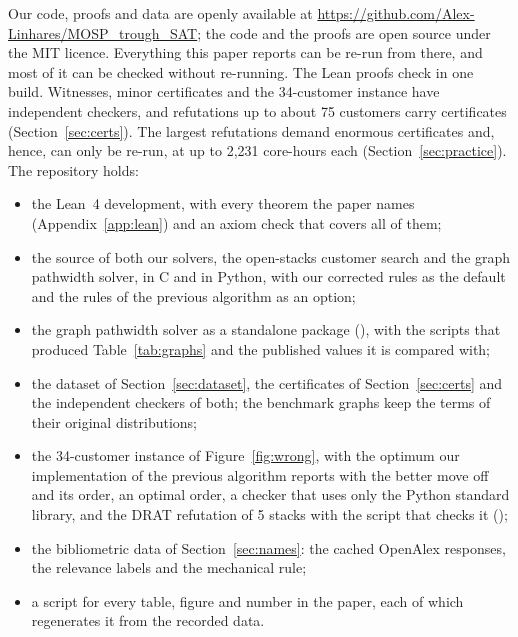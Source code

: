 Our code, proofs and data are openly available at
\url{https://github.com/Alex-Linhares/MOSP_trough_SAT}; the code and the proofs
are open source under the MIT licence. Everything this paper reports can be
re-run from there, and most of it can be checked
without re-running. The Lean proofs check in one build. Witnesses, minor
certificates and the 34-customer instance have independent checkers, and
refutations up to about 75 customers carry certificates
(Section~\ref{sec:certs}). The largest refutations demand enormous certificates and, hence, can only be
re-run, at up to 2,231 core-hours each
(Section~\ref{sec:practice}). The repository holds:
\begin{itemize}
\item the Lean~4 development, with every theorem the paper names
  (Appendix~\ref{app:lean}) and an axiom check that covers all of them;
\item the source of both our solvers, the open-stacks customer search and the
  graph pathwidth solver, in C and in Python, with our corrected rules as the
  default and the rules of the previous algorithm \citep{ChuStuckey2009} as an
  option;
\item the graph pathwidth solver as a standalone package
  (), with the scripts that produced
  Table~\ref{tab:graphs} and the published values it is compared with;
\item the dataset of Section~\ref{sec:dataset}, the certificates of
  Section~\ref{sec:certs} and the independent checkers of both; the benchmark
  graphs keep the terms of their original distributions;
\item the 34-customer instance of Figure~\ref{fig:wrong}, with the optimum our
  implementation of the previous algorithm reports with the better move off and
  its order, an optimal order, a checker that uses only the Python standard
  library, and the DRAT refutation of 5 stacks with the script that checks it
  ();
\item the bibliometric data of Section~\ref{sec:names}: the cached OpenAlex
  responses, the relevance labels and the mechanical rule;
\item a script for every table, figure and number in the paper, each of which
  regenerates it from the recorded data.
\end{itemize}
